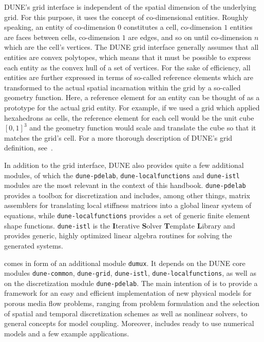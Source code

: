 DUNE's grid interface is independent of the spatial dimension of the
underlying grid. For this purpose, it uses the concept of
co-dimensional entities. Roughly speaking, an entity of co-dimension
$0$ constitutes a cell, co-dimension $1$ entities are faces between
cells, co-dimension $1$ are edges, and so on until co-dimension $n$
which are the cell's vertices.  The DUNE grid interface generally
assumes that all entities are convex polytopes, which means that it
must be possible to express each entity as the convex hull of a set of
vertices. For the sake of efficiency, all entities are further expressed in terms
of so-called reference elements which are transformed to the actual
spatial incarnation within the grid by a so-called geometry
function. Here, a reference element for an
entity can be thought of as a prototype for the actual grid
entity. For example, if we used a grid which applied hexahedrons as cells,
the reference element for each cell would be the unit cube $[0, 1]^3$
and the geometry function would scale and translate the cube so that
it matches the grid's cell. For a more thorough description of DUNE's
grid definition, see~\cite{BASTIAN2008}.

In addition to the grid interface, DUNE also provides quite a few
additional modules, of which the \texttt{dune-pdelab},
\texttt{dune-localfunctions} and \texttt{dune-istl} modules are the
most relevant in the context of this handbook.  \texttt{dune-pdelab}
provides a toolbox for discretization and includes, among other things, matrix assemblers
for translating local stiffness matrices into a global linear system
of equations, while \texttt{dune-localfunctions}
provides a set of generic finite element shape
functions. \texttt{dune-istl} is the \textbf{I}terative
\textbf{S}olver \textbf{T}emplate \textbf{L}ibrary and provides
generic, highly optimized linear algebra routines for solving the
generated systems.

\Dumux comes in form of an additional module \texttt{dumux}. 
It depends on the DUNE core modules 
\texttt{dune-common}, \texttt{dune-grid}, \texttt{dune-istl}, \texttt{dune-localfunctions}, as well as on 
the discretization module \texttt{dune-pdelab}. 
The main intention of \Dumux is to provide a framework for an easy and efficient 
implementation of new physical models for porous media flow problems, 
ranging from problem formulation and the selection of 
spatial and temporal discretization schemes as well as nonlinear solvers,  
to general concepts for model coupling.  
Moreover, \Dumux includes ready to use numerical models and a few example applications.  

